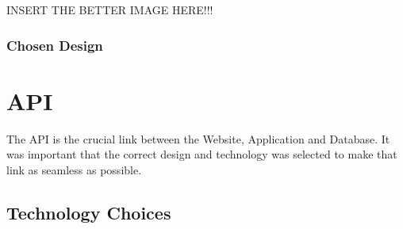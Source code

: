 \documentclass[11pt,a4paper]{report}
\begin{document}
INSERT THE BETTER IMAGE HERE!!!\\


\subsubsection{Chosen Design}
\label{sec:chosen-designs}

\section{API}
\label{sec:api-design}

The API is the crucial link between the Website, Application and Database. It was important that the correct design and technology was selected to make that link as seamless as possible. 

\subsection{Technology Choices}
\label{sec:api:techChoices}
\end{document}
